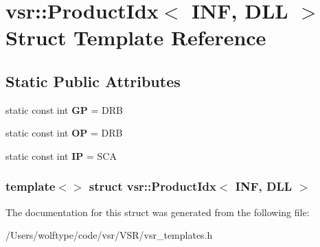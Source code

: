 \hypertarget{structvsr_1_1_product_idx_3_01_i_n_f_00_01_d_l_l_01_4}{\section{vsr\-:\-:Product\-Idx$<$ I\-N\-F, D\-L\-L $>$ Struct Template Reference}
\label{structvsr_1_1_product_idx_3_01_i_n_f_00_01_d_l_l_01_4}
}
\subsection*{Static Public Attributes}
\begin{DoxyCompactItemize}
\item 
\hypertarget{structvsr_1_1_product_idx_3_01_i_n_f_00_01_d_l_l_01_4_a5f4f24c7e01ea4fa489ff5497e80609a}{static const int {\bfseries G\-P} = D\-R\-B}\label{structvsr_1_1_product_idx_3_01_i_n_f_00_01_d_l_l_01_4_a5f4f24c7e01ea4fa489ff5497e80609a}

\item 
\hypertarget{structvsr_1_1_product_idx_3_01_i_n_f_00_01_d_l_l_01_4_a4704cc6775f6ffb21c58743b2199fc78}{static const int {\bfseries O\-P} = D\-R\-B}\label{structvsr_1_1_product_idx_3_01_i_n_f_00_01_d_l_l_01_4_a4704cc6775f6ffb21c58743b2199fc78}

\item 
\hypertarget{structvsr_1_1_product_idx_3_01_i_n_f_00_01_d_l_l_01_4_ab300a8db40b1dafa484efa70fd3a4ab3}{static const int {\bfseries I\-P} = S\-C\-A}\label{structvsr_1_1_product_idx_3_01_i_n_f_00_01_d_l_l_01_4_ab300a8db40b1dafa484efa70fd3a4ab3}

\end{DoxyCompactItemize}
\subsubsection*{template$<$$>$ struct vsr\-::\-Product\-Idx$<$ I\-N\-F, D\-L\-L $>$}



The documentation for this struct was generated from the following file\-:\begin{DoxyCompactItemize}
\item 
/\-Users/wolftype/code/vsr/\-V\-S\-R/vsr\-\_\-templates.\-h\end{DoxyCompactItemize}

